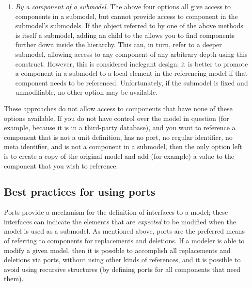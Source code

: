 \begin{enumerate}
\item \emph{By a component of a submodel}.  The above four options all give access to components in a submodel, but cannot provide access to component in the submodel's submodels.  If the object referred to by one of the above methods is itself a submodel, adding an \SBaseRef child to the \SBaseRef allows you to find components further down inside the hierarchy.  This can, in turn, refer to a deeper submodel, allowing access to any component of any arbitrary depth using this construct.  However, this is considered inelegant design; it is better to promote a component in a submodel to a local element in the referencing model if that component needs to be referenced. Unfortunately, if the submodel is fixed and unmodifiable, no other option may be available.

\end{enumerate}

These approaches do not allow access to components that have none of these options available.  If you do not have control over the model in question (for example, because it is in a third-party database), and you want to reference a component that is not a unit definition, has no port, no regular identifier, no meta identifier, and is not a component in a submodel, then the only option left is to create a copy of the original model and add (for example) a  value to the component that you wish to reference.


\subsection{Best practices for using ports}
\label{best-practices-ports}



Ports provide a mechanism for the definition of interfaces to a model; these interfaces can indicate the elements that are \emph{expected} to be modified when the model is used as a submodel.  As mentioned above, ports are the preferred means of referring to components for replacements and deletions.  If a modeler is able to modify a given model, then it is possible to accomplish all replacements and deletions via ports, without using other kinds of references, and it is possible to avoid using recursive \SBaseRef structures (by defining ports for all components that need them).

